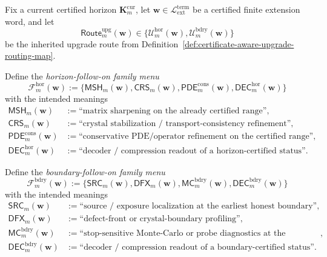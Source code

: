 \begin{definition}
\label{def:normalized-follow-on-upgrade-families}
Fix a current certified horizon \(\mathbf K_m^{\mathrm{cur}}\), let \(\mathbf w\in \mathcal L_{\mathrm{ext}}^{\mathrm{term}}\) be a certified finite extension word, and let
\[
 \mathsf{Route}^{\mathrm{upg}}_{m}(\mathbf w)
 \in
 \{\mathcal U^{\mathrm{hor}}_{m}(\mathbf w),\mathcal U^{\mathrm{bdry}}_{m}(\mathbf w)\}
\]
be the inherited upgrade route from Definition~\ref{def:certificate-aware-upgrade-routing-map}.

Define the \emph{horizon-follow-on family menu}
\[
 \mathcal F^{\mathrm{hor}}_{m}(\mathbf w)
 :=
 \{\mathsf{MSH}_{m}(\mathbf w),\mathsf{CRS}_{m}(\mathbf w),\mathsf{PDE}^{\mathrm{cons}}_{m}(\mathbf w),\mathsf{DEC}^{\mathrm{hor}}_{m}(\mathbf w)\}
\]
with the intended meanings
\begin{align*}
 \mathsf{MSH}_{m}(\mathbf w) &:= \text{``matrix sharpening on the already certified range''},\\
 \mathsf{CRS}_{m}(\mathbf w) &:= \text{``crystal stabilization / transport-consistency refinement''},\\
 \mathsf{PDE}^{\mathrm{cons}}_{m}(\mathbf w) &:= \text{``conservative PDE/operator refinement on the certified range''},\\
 \mathsf{DEC}^{\mathrm{hor}}_{m}(\mathbf w) &:= \text{``decoder / compression readout of a horizon-certified status''}.
\end{align*}

Define the \emph{boundary-follow-on family menu}
\[
 \mathcal F^{\mathrm{bdry}}_{m}(\mathbf w)
 :=
 \{\mathsf{SRC}_{m}(\mathbf w),\mathsf{DFX}_{m}(\mathbf w),\mathsf{MC}^{\mathrm{bdry}}_{m}(\mathbf w),\mathsf{DEC}^{\mathrm{bdry}}_{m}(\mathbf w)\}
\]
with the intended meanings
\begin{align*}
 \mathsf{SRC}_{m}(\mathbf w) &:= \text{``source / exposure localization at the earliest honest boundary''},\\
 \mathsf{DFX}_{m}(\mathbf w) &:= \text{``defect-front or crystal-boundary profiling''},\\
 \mathsf{MC}^{\mathrm{bdry}}_{m}(\mathbf w) &:= \text{``stop-sensitive Monte-Carlo or probe diagnostics at the boundary side''},\\
 \mathsf{DEC}^{\mathrm{bdry}}_{m}(\mathbf w) &:= \text{``decoder / compression readout of a boundary-certified status''}.
\end{align*}


\end{definition}
